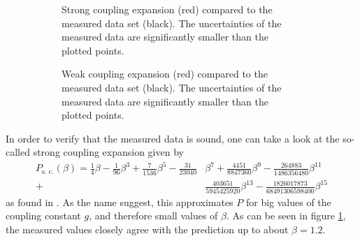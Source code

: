\begin{figure}[!hbt]
 \begin{subfigure}[t]{0.49\textwidth}
  
  \caption{Strong coupling expansion (red) compared to the measured data set (black). The uncertainties of the measured data are significantly smaller than the plotted points.}
  \label{plot:strongCoupling}
 \end{subfigure}
 \begin{subfigure}[t]{0.49\textwidth}
  
  \caption{Weak coupling expansion (red) compared to the measured data set (black). The uncertainties of the measured data are significantly smaller than the plotted points.}
  \label{plot:weakCoupling}
 \end{subfigure}
 \caption{}
 \centering
\end{figure}

In order to verify that the measured data is sound, one can take a look at the so-called strong coupling expansion given by
\begin{align*}
 P_{\textrm{s. c.}}(\beta) = \frac{1}{4} \beta - \frac{1}{96} \beta^3 + \frac{7}{1536} \beta^5 - \frac{31}{23040} & \beta^7 + \frac{4451}{8847360} \beta^9 - \frac{264883}{1486356480} \beta^{11}       \\
 +                                                                                                                & \frac{403651}{5945425920} \beta^{13} - \frac{1826017873}{68491306598400} \beta^{15}
\end{align*} as found in \cite{Denbleyker:2008}. As the name suggest, this approximates $P$ for big values of the coupling constant $g$, and therefore small values of $\beta$. As can be seen in figure \ref{plot:strongCoupling}, the measured values closely agree with the prediction up to about $\beta = 1.2$.

